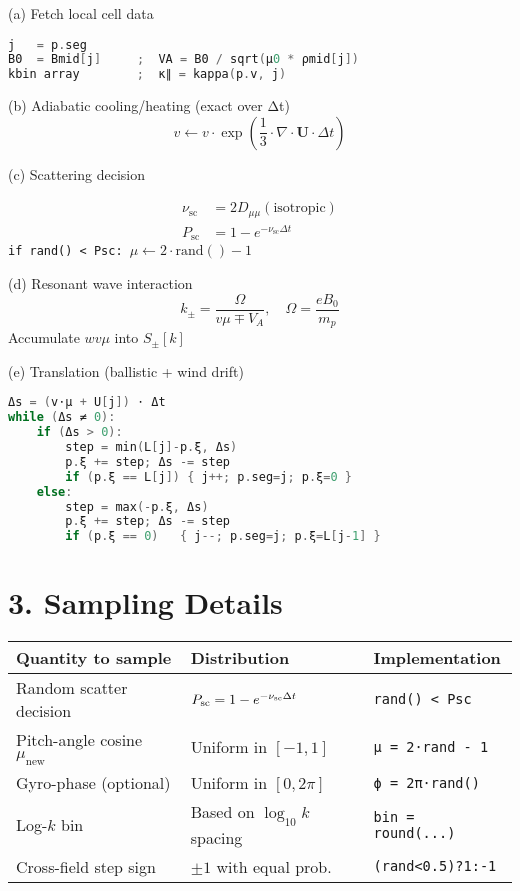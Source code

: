 \begin{tcolorbox}[colback=white]
(a) Fetch local cell data

\begin{lstlisting}[language=C++,basicstyle=\ttfamily\footnotesize]
j   = p.seg
B0  = Bmid[j]     ;  VA = B0 / sqrt(μ0 * ρmid[j])
kbin array        ;  κ∥ = kappa(p.v, j)
\end{lstlisting}

(b) Adiabatic cooling/heating (exact over Δt)
\[
v \leftarrow v \cdot \exp\left( \frac{1}{3} \cdot \nabla\cdot\boldsymbol{U} \cdot \Delta t \right)
\]

(c) Scattering decision

\begin{align*}
\nu_{\text{sc}} &= 2 D_{\mu\mu}(\text{isotropic}) \\
P_{\text{sc}} &= 1 - e^{-\nu_{\text{sc}} \Delta t}
\end{align*}
\texttt{if rand() < Psc: $\mu \leftarrow 2\cdot \text{rand}() - 1$}

(d) Resonant wave interaction
\[
k_\pm = \frac{\Omega}{v\mu \mp V_A}, \quad \Omega = \frac{eB_0}{m_p}
\]
Accumulate $w v \mu$ into $S_\pm[k]$

(e) Translation (ballistic + wind drift)
\begin{lstlisting}[language=C++,basicstyle=\ttfamily\footnotesize]
Δs = (v⋅μ + U[j]) ⋅ Δt
while (Δs ≠ 0):
    if (Δs > 0):
        step = min(L[j]-p.ξ, Δs)
        p.ξ += step; Δs -= step
        if (p.ξ == L[j]) { j++; p.seg=j; p.ξ=0 }
    else:
        step = max(-p.ξ, Δs)
        p.ξ += step; Δs -= step
        if (p.ξ == 0)   { j--; p.seg=j; p.ξ=L[j-1] }
\end{lstlisting}
\end{tcolorbox}

\section*{3. Sampling Details}

\begin{center}
\begin{tabular}{p{6cm} p{5.5cm} p{3.5cm}}
\toprule
\textbf{Quantity to sample} & \textbf{Distribution} & \textbf{Implementation} \\
\midrule
Random scatter decision & $P_{\rm sc} = 1 - e^{-\nu_{\rm sc}\Delta t}$ & \texttt{rand() < Psc} \\
Pitch-angle cosine $\mu_{\text{new}}$ & Uniform in $[-1,1]$ & \texttt{μ = 2⋅rand - 1} \\
Gyro-phase (optional) & Uniform in $[0,2\pi]$ & \texttt{ϕ = 2π⋅rand()} \\
Log-$k$ bin & Based on $\log_{10}k$ spacing & \texttt{bin = round(...)} \\
Cross-field step sign & $\pm1$ with equal prob. & \texttt{(rand<0.5)?1:-1} \\
\bottomrule
\end{tabular}
\end{center}

